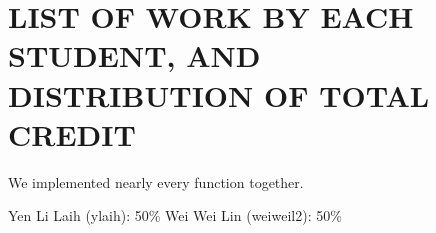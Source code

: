 \section{LIST OF WORK BY EACH STUDENT, AND DISTRIBUTION OF TOTAL CREDIT}
We implemented nearly every function together.

Yen Li Laih (ylaih): 50\%
Wei Wei Lin (weiweil2): 50\%